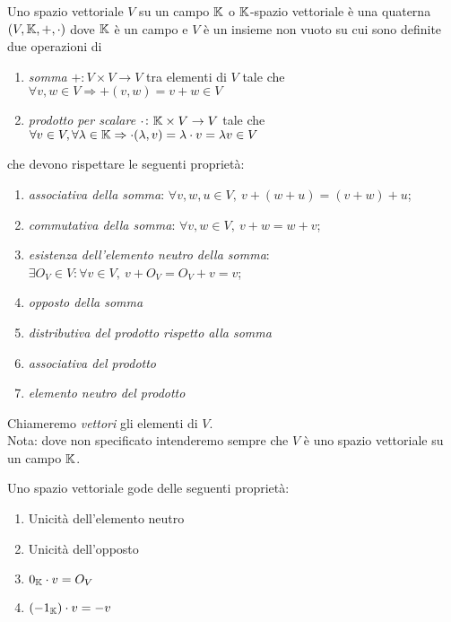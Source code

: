 \begin{definition}
	Uno spazio vettoriale $ V $ su un campo $ \mathbb{K} $ o $ \mathbb{K} $-spazio vettoriale è una quaterna $ (V, \mathbb{K}, +, \cdot) $ 
	dove $ \mathbb{K} $ è un campo e $ V $ è un insieme non vuoto su cui sono definite due operazioni di 

	\begin{enumerate}
		\item \emph{somma} $ + \colon V \times V \to V $ tra elementi di $ V $ tale che $ \forall v, w \in V \Rightarrow + (v, w) = v + w \in V $
		\item \emph{prodotto per scalare} $ \cdot \colon \mathbb{K} \times V \to V $ tale che $ \forall v \in V, \forall \lambda \in \mathbb{K} \Rightarrow \cdot (\lambda, v) = \lambda \cdot v = \lambda v \in V $
	\end{enumerate}
	che devono rispettare le seguenti proprietà:
	\begin{enumerate}[label=(\roman*)]
		\item \emph{associativa della somma}: $ \forall v, w, u \in V, \ v + (w + u) = (v + w) + u $;
		\item \emph{commutativa della somma}: $ \forall v, w \in V, \ v + w = w + v $;
		\item \emph{esistenza dell'elemento neutro della somma}: $ \exists O_{V} \in V : \forall v \in V, \ v + O_{V} = O_{V} + v = v $;
		\item \emph{opposto della somma}
		\item \emph{distributiva del prodotto rispetto alla somma}
		\item \emph{associativa del prodotto}
		\item \emph{elemento neutro del prodotto}
	\end{enumerate}
	Chiameremo \emph{vettori} gli elementi di $ V $. \\
	\textsf{Nota: dove non specificato intenderemo sempre che $ V $ è uno spazio vettoriale su un campo $ \mathbb{K} $.}
\end{definition}

\begin{propriety} Uno spazio vettoriale gode delle seguenti proprietà:
	\begin{enumerate}
		\item Unicità dell'elemento neutro
		\item Unicità dell'opposto
		\item $ 0_{\mathbb{K}} \cdot v = O_V $
		\item $ (-1_{\mathbb{K}}) \cdot v = -v $
	\end{enumerate}
\end{propriety}


